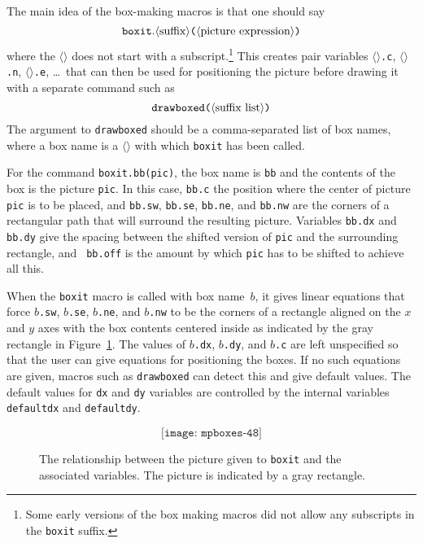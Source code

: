 \documentclass{article} %
\newcommand\descr[1]{{\langle\hbox{\rm#1}\rangle}}
\newcommand\invisgap{\nobreak\hskip0pt\relax}
\newcommand\tdescr[1]{$\langle$\invisgap{\rm#1}\invisgap$\rangle$}
\begin{document}
The main idea of the box-making macros is that one should
say\label{Dboxit}
$$ {\tt boxit.} \descr{suffix}
   \hbox{\tt(} \descr{picture expression} \hbox{\tt)}
$$
where the \tdescr{suffix} does not start with a subscript.\footnote{Some early
versions of the box making macros did not allow any subscripts in the
{\tt boxit} suffix.}
This creates pair variables \tdescr{suffix}{\tt.c},
\tdescr{suffix}{\tt.n}, \tdescr{suffix}{\tt.e}, \ldots\ that can then be
used for positioning the picture before drawing it with a separate command such
as\label{Ddrbxed}
$$ \hbox{\tt drawboxed(} \descr{suffix list} \hbox{\tt )} $$
The argument to {\tt drawboxed} should be a comma-separated list of box names,
where a box name is a \tdescr{suffix} with which {\tt boxit}
has been called.

For the command {\tt boxit.bb(pic)}, the box name is {\tt bb} and the
contents of the box is the picture {\tt pic}.  In this case, {\tt bb.c}
the position where the center of picture {\tt pic} is to be placed, and
{\tt bb.sw}, {\tt bb.se}, {\tt bb.ne}, and {\tt bb.nw} are the corners
of a rectangular path that will surround the resulting picture.
Variables {\tt bb.dx} and {\tt bb.dy} give the spacing between the
shifted version of {\tt pic} and the surrounding rectangle, and {\tt
bb.off} is the amount by which {\tt pic} has to be shifted to achieve
all this.

When the {\tt boxit} macro is called with box name~$b$, it gives linear
equations that force $b${\tt.sw}, $b${\tt.se}, $b${\tt.ne}, and
$b${\tt.nw} to be the corners of a rectangle aligned on the $x$ and $y$
axes with the box contents centered inside as indicated by the gray
rectangle in Figure~\ref{fig48}.  The values of $b${\tt.dx},
$b${\tt.dy}, and $b${\tt.c} are left unspecified so that the user can
give equations for positioning the boxes.  If no such equations are
given, macros such as {\tt drawboxed} can detect this and give default
values.  The default values for {\tt dx} and {\tt dy} variables are
controlled by the internal variables {\tt
defaultdx}\label{Ddefaultdx} and
{\tt defaultdy}\label{Ddefaultdy}.

\begin{figure}[htp]
$$ \texttt{[image: mpboxes-48]} $$
\caption[How a {\tt boxit} picture relates to the associated variables]
        {The relationship between the picture given to {\tt boxit} and the
        associated variables.  The picture is indicated by a gray rectangle.}
\label{fig48}
\end{figure}
\end{document}
